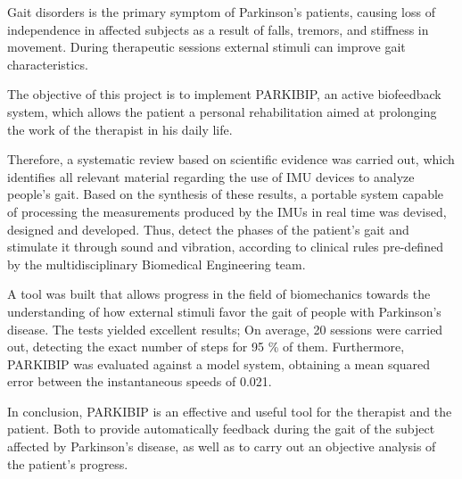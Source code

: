 \begin{foreignabstract}

Gait disorders is the primary symptom of Parkinson's patients, causing loss of independence in affected subjects as a result of falls, tremors, and stiffness in movement. During therapeutic sessions external stimuli can improve gait characteristics.

The objective of this project is to implement PARKIBIP, an active biofeedback system, which allows the patient a personal rehabilitation aimed at prolonging the work of the therapist in his daily life.

Therefore, a systematic review based on scientific evidence was carried out, which identifies all relevant material regarding the use of IMU devices to analyze people's gait. Based on the synthesis of these results, a portable system capable of processing the measurements produced by the IMUs in real time was devised, designed and developed. Thus, detect the phases of the patient's gait and stimulate it through sound and vibration, according to clinical rules pre-defined by the multidisciplinary Biomedical Engineering team.

A tool was built that allows progress in the field of biomechanics towards the understanding of how external stimuli favor the gait of people with Parkinson's disease. The tests yielded excellent results; On average, 20 sessions were carried out, detecting the exact number of steps for 95 \% of them. Furthermore, PARKIBIP was evaluated against a model system, obtaining a mean squared error between the instantaneous speeds of 0.021.

In conclusion, PARKIBIP is an effective and useful tool for the therapist and the patient. Both to provide automatically feedback during the gait of the subject affected by Parkinson's disease, as well as to carry out an objective analysis of the patient's progress. 

\end{foreignabstract}